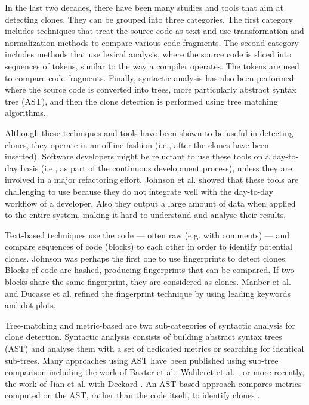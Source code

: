 In the last two decades, there have been many studies and tools that aim at detecting clones.
They can be grouped into three categories.
The first category includes techniques that treat the source code as text and use transformation and normalization methods to compare various code fragments\cite{Johnson1994,Johnson1993, Cordy2011, Roy2008}.
The second category includes methods that use lexical analysis, where the source code is sliced into sequences of tokens, similar to the way a compiler operates\cite{Baker,Bakera,Baker2002,Kamiya2002,Li2006}.
The tokens are used to compare code fragments.
Finally, syntactic analysis has also been performed where the source code is converted into trees, more particularly abstract syntax tree (AST), and then the clone detection is performed using tree matching algorithms\cite{Baxter1998, Komondoor2000, Tairas2006, Falke2008}.

Although these techniques and tools have been shown to be useful in detecting clones, they operate in an offline fashion (i.e., after the clones have been inserted).
Software developers might be reluctant to use these tools on a day-to-day basis (i.e., as part of the continuous development process), unless they are involved in a major refactoring effort.
Johnson et al. \cite{Johnson2013} showed that these tools are challenging to use because they do not integrate well with the day-to-day workflow of a developer.
Also they output a large amount of data when applied to the entire system, making it hard to understand and analyse their results.

Text-based techniques use the code --- often raw (e.g. with comments) --- and compare sequences of code (blocks) to each other in order to identify potential clones. Johnson was perhaps the first one to use fingerprints to detect clones\cite{Johnson1993,Johnson1994}. Blocks of code are hashed, producing fingerprints that can be compared.
If two blocks share the same fingerprint, they are considered as clones.
Manber et al. \cite{Manber1994} and Ducasse et al.\cite{Ducasse1999} refined the fingerprint technique by using leading keywords and dot-plots.

Tree-matching and metric-based are two sub-categories of syntactic analysis for clone detection.
Syntactic analysis consists of building abstract syntax trees (AST) and analyse them with a set of dedicated metrics or searching for identical sub-trees.
Many approaches using AST have been published using sub-tree comparison including the work of Baxter et al.\cite{Baxter1998}, Wahleret et al. \cite{Wahler}, or more recently, the work of Jian et al. with Deckard \cite{Jiang2007}.
An AST-based approach compares metrics computed on the AST, rather than the code itself, to identify clones \cite{Patenaude1999, Balazinska}.

